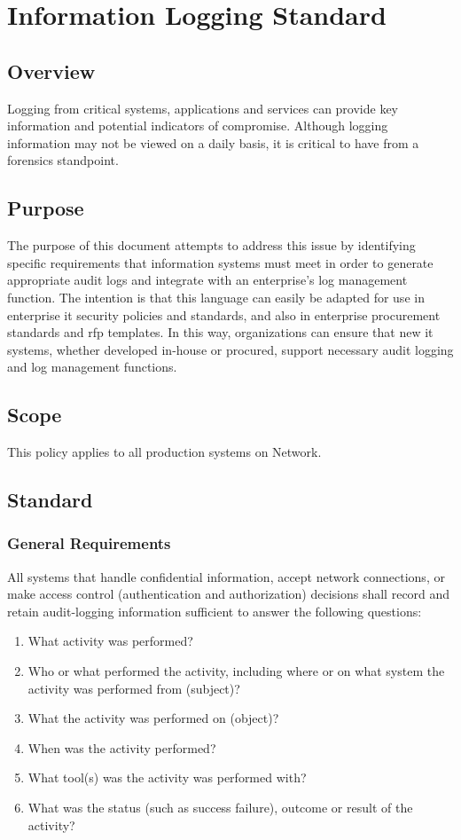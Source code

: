\chapter{Information Logging Standard}
\CommonIntroduction
\section{Overview}
Logging from critical systems, applications and services can provide key information and potential indicators of compromise.  
Although logging information may not be viewed on a daily basis, it is critical to have from a forensics standpoint. 
\section{Purpose}
The purpose of this document attempts to address this issue by identifying specific requirements that information systems must meet in order to generate appropriate audit logs and integrate with an enterprise's log management function.  
The intention is that this language can easily be adapted for use in enterprise \gls{it} security policies and standards, and also in enterprise procurement standards and \gls{rfp} templates.  
In this way, organizations can ensure that new \gls{it} systems, whether developed in-house or procured, support necessary audit logging and log management functions.
\section{Scope}
This policy applies to all production systems on \CompanyName{} Network. 
\section{Standard}
\subsection{General Requirements}
All systems that handle confidential information, accept network connections, or make access control (authentication and authorization) decisions shall record and retain audit-logging information sufficient to answer the following questions:
\begin{enumerate}
\item
What activity was performed?
\item
Who or what performed the activity, including where or on what system the activity was performed from (subject)?
\item
What the activity was performed on (object)?
\item
When was the activity performed?
\item
What tool(s) was the activity was performed with?
\item
What was the status (such as success \vs{} failure), outcome\oxford{} or result of the activity?
\end{enumerate}

